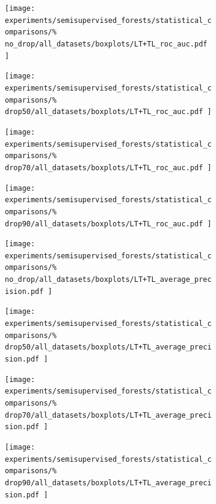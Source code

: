 \begin{figure}[tb]
    \centering
    \begin{subfigure}{0.24\textwidth}
        \texttt{[image: 
            experiments/semisupervised\_forests/statistical\_comparisons/\%
            no\_drop/all\_datasets/boxplots/LT+TL\_roc\_auc.pdf
        ]}
    \end{subfigure}
    \begin{subfigure}{0.24\textwidth}
        \texttt{[image: 
            experiments/semisupervised\_forests/statistical\_comparisons/\%
            drop50/all\_datasets/boxplots/LT+TL\_roc\_auc.pdf
        ]}
    \end{subfigure}
    \begin{subfigure}{0.24\textwidth}
        \texttt{[image: 
            experiments/semisupervised\_forests/statistical\_comparisons/\%
            drop70/all\_datasets/boxplots/LT+TL\_roc\_auc.pdf
        ]}
    \end{subfigure}
    \begin{subfigure}{0.24\textwidth}
        \texttt{[image: 
            experiments/semisupervised\_forests/statistical\_comparisons/\%
            drop90/all\_datasets/boxplots/LT+TL\_roc\_auc.pdf
        ]}
    \end{subfigure}

    \begin{subfigure}{0.24\textwidth}
        \texttt{[image: 
            experiments/semisupervised\_forests/statistical\_comparisons/\%
            no\_drop/all\_datasets/boxplots/LT+TL\_average\_precision.pdf
        ]}
    \end{subfigure}
    \begin{subfigure}{0.24\textwidth}
        \texttt{[image: 
            experiments/semisupervised\_forests/statistical\_comparisons/\%
            drop50/all\_datasets/boxplots/LT+TL\_average\_precision.pdf
        ]}
    \end{subfigure}
    \begin{subfigure}{0.24\textwidth}
        \texttt{[image: 
            experiments/semisupervised\_forests/statistical\_comparisons/\%
            drop70/all\_datasets/boxplots/LT+TL\_average\_precision.pdf
        ]}
    \end{subfigure}
    \begin{subfigure}{0.24\textwidth}
        \texttt{[image: 
            experiments/semisupervised\_forests/statistical\_comparisons/\%
            drop90/all\_datasets/boxplots/LT+TL\_average\_precision.pdf
        ]}
    \end{subfigure}


\end{figure}
